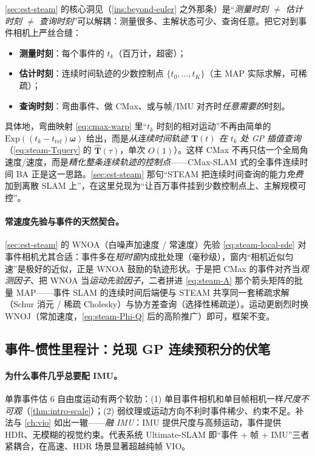 \begin{insight}
\cref{sec:est-steam} 的核心洞见（\cref{ins:beyond-euler} 之外那条）是“\emph{测量时刻 $\ne$ 估计时刻 $\ne$ 查询时刻}”可以解耦：测量很多、主解状态可少、查询任意。把它对到事件相机上严丝合缝：
\begin{itemize}
  \item \textbf{测量时刻}：每个事件的 $t_k$（百万计，超密）；
  \item \textbf{估计时刻}：连续时间轨迹的少数控制点 $\{t_0,\dots,t_K\}$（主 MAP 实际求解，可稀疏）；
  \item \textbf{查询时刻}：弯曲事件、做 CMax、或与帧/IMU 对齐时\emph{任意需要的}时刻。
\end{itemize}
具体地，弯曲映射 \cref{eq:cmax-warp} 里“$t_k$ 时刻的相对运动”不再由简单的 $\mathrm{Exp}((t_k-t_{\mathrm{ref}})\boldsymbol\omega)$ 给出，而是\emph{从连续时间轨迹 $\mathbf T(t)$ 在 $t_k$ 处 GP 插值查询}（\cref{eq:steam-Tquery} 的 $\hat{\mathbf T}(\tau)$，单次 $O(1)$）。这样 CMax 不再只估一个全局角速度/速度，而是\emph{精化整条连续轨迹的控制点}——CMax-SLAM 式的全事件连续时间 BA\cite{guo2024cmaxslam} 正是这一思路。\cref{sec:est-steam} 那句“STEAM 把连续时间查询的能力\emph{免费}加到离散 SLAM 上”，在这里兑现为“让百万事件挂到少数控制点上、主解规模可控”。
\end{insight}

\paragraph{常速度先验与事件的天然契合。}
\cref{sec:est-steam} 的 WNOA（白噪声加速度 / 常速度）先验 \cref{eq:steam-local-sde} 对事件相机尤其合适：事件多在\emph{短时窗}内成批处理（毫秒级），窗内“相机近似匀速”是极好的近似，正是 WNOA 鼓励的轨迹形状。于是把 CMax 的事件对齐当\emph{观测因子}、把 WNOA 当\emph{运动先验因子}，二者拼进 \cref{eq:steam-A} 那个箭头矩阵的批量 MAP——事件 SLAM 的连续时间后端便与 STEAM 共享同一套稀疏求解（Schur 消元 / 稀疏 Cholesky）与协方差查询（选择性稀疏逆）。运动更剧烈时换 WNOJ（常加速度，\cref{eq:steam-Phi-Q} 后的高阶推广）即可，框架不变。

\subsection{事件-惯性里程计：兑现 GP 连续预积分的伏笔}
\label{sec:event-vio}

\paragraph{为什么事件几乎总要配 IMU。}
单靠事件估 6 自由度运动有两个软肋：(1) 单目事件相机和单目帧相机一样\emph{尺度不可观}（\cref{thm:intro-scale}）；(2) 弱纹理或运动方向不利时事件稀少、约束不足。补法与 \cref{ch:vio} 如出一辙——\emph{融 IMU}：IMU 提供尺度与高频运动，事件提供 HDR、无模糊的视觉约束。代表系统 Ultimate-SLAM\cite{vidal2018ultimate} 即“事件 + 帧 + IMU”三者紧耦合，在高速、HDR 场景显著超越纯帧 VIO。

